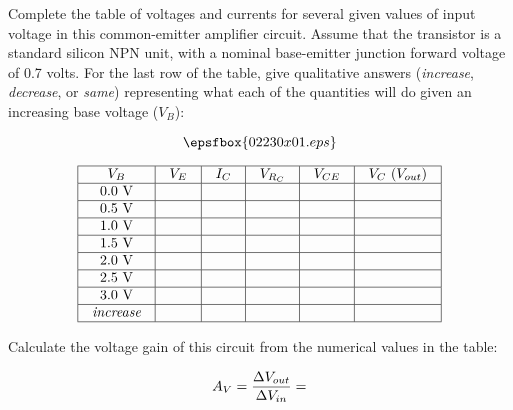 

Complete the table of voltages and currents for several given values of input voltage in this common-emitter amplifier circuit.  Assume that the transistor is a standard silicon NPN unit, with a nominal base-emitter junction forward voltage of 0.7 volts.  For the last row of the table, give qualitative answers ({\it increase}, {\it decrease}, or {\it same}) representing what each of the quantities will do given an increasing base voltage ($V_B$):

$$\epsfbox{02230x01.eps}$$


$$\vbox{\offinterlineskip
\halign{\strut
\vrule \quad\hfil # \ \hfil & 
\vrule \quad\hfil # \ \hfil & 
\vrule \quad\hfil # \ \hfil & 
\vrule \quad\hfil # \ \hfil & 
\vrule \quad\hfil # \ \hfil & 
\vrule \quad\hfil # \ \hfil \vrule \cr
\noalign{\hrule}
%
$V_B$ & $V_E$ & $I_C$  & $V_{R_C}$ & $V_{CE}$ & $V_C$ ($V_{out}$) \cr
%
\noalign{\hrule}
%
0.0 V &  &  &  &  & \cr
%
\noalign{\hrule}
%
0.5 V &  &  &  &  & \cr
%
\noalign{\hrule}
%
1.0 V &  &  &  &  & \cr
%
\noalign{\hrule}
%
1.5 V &  &  &  &  & \cr
%
\noalign{\hrule}
%
2.0 V &  &  &  &  & \cr
%
\noalign{\hrule}
%
2.5 V &  &  &  &  & \cr
%
\noalign{\hrule}
%
3.0 V &  &  &  &  & \cr
%
\noalign{\hrule}
%
{\it increase} &  &  &  &  & \cr
%
\noalign{\hrule}
} %
}$$ %

Calculate the voltage gain of this circuit from the numerical values in the table:

$$A_V = {\Delta V_{out} \over \Delta V_{in}} = $$








